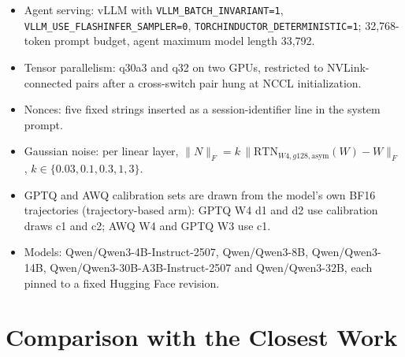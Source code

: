 \begin{itemize}[leftmargin=*,itemsep=0pt,topsep=2pt]
\item Agent serving: vLLM with \texttt{VLLM\_BATCH\_INVARIANT=1}, \texttt{VLLM\_USE\_FLASHINFER\_SAMPLER=0}, \texttt{TORCHINDUCTOR\_DETERMINISTIC=1}; 32,768-token prompt budget, agent maximum model length 33,792.
\item Tensor parallelism: q30a3 and q32 on two GPUs, restricted to NVLink-connected pairs after a cross-switch pair hung at NCCL initialization.
\item Nonces: five fixed strings inserted as a session-identifier line in the system prompt.
\item Gaussian noise: per linear layer, $\lVert N\rVert_F = k\,\lVert \mathrm{RTN}_{W4,g128,\text{asym}}(W) - W\rVert_F$, $k \in \{0.03, 0.1, 0.3, 1, 3\}$.
\item GPTQ and AWQ calibration sets are drawn from the model's own BF16 trajectories (trajectory-based arm): GPTQ W4 d1 and d2 use calibration draws c1 and c2; AWQ W4 and GPTQ W3 use c1.
\item Models: Qwen/Qwen3-4B-Instruct-2507, Qwen/Qwen3-8B, Qwen/Qwen3-14B, Qwen/Qwen3-30B-A3B-Instruct-2507 and Qwen/Qwen3-32B, each pinned to a fixed Hugging Face revision.
\end{itemize}



\section{Comparison with the Closest Work}
\label{app:comparison}

